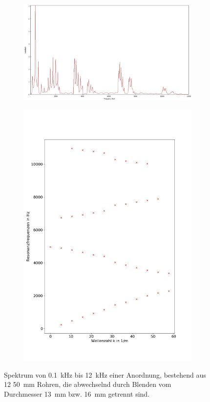 \begin{figure}
\centering
\begin{subfigure}{0.65\textwidth}
\includegraphics[width=\textwidth]{content/messungen/Chapter4b/4b_5_12_alternating.jpg}
\end{subfigure}
\begin{subfigure}{0.34\textwidth}
\includegraphics[width=\textwidth]{content/Scripts/4b_5_alt_red.jpg}
\end{subfigure}
\caption{Spektrum von 0.1~kHz bis 12~kHz einer Anordnung, bestehend aus 12 50~mm Rohren, die abwechselnd durch Blenden vom Durchmesser 13~mm bzw. 16~mm getrennt sind.}
\label{fig:4b_5_12_alternating}
\end{figure}
